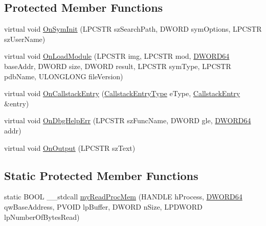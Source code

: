 \subsection*{Protected Member Functions}
\begin{DoxyCompactItemize}
\item 
virtual void \hyperlink{class_stack_walker_a7feaf96c40d81dcbd0bfcd34f78eaa30}{On\-Sym\-Init} (L\-P\-C\-S\-T\-R sz\-Search\-Path, D\-W\-O\-R\-D sym\-Options, L\-P\-C\-S\-T\-R sz\-User\-Name)
\item 
virtual void \hyperlink{class_stack_walker_a64c6c648aee9a33e881f449aecd51912}{On\-Load\-Module} (L\-P\-C\-S\-T\-R img, L\-P\-C\-S\-T\-R mod, \hyperlink{_stack_walker_8h_a97fb241c597b99bcb965858f53cacac4}{D\-W\-O\-R\-D64} base\-Addr, D\-W\-O\-R\-D size, D\-W\-O\-R\-D result, L\-P\-C\-S\-T\-R sym\-Type, L\-P\-C\-S\-T\-R pdb\-Name, U\-L\-O\-N\-G\-L\-O\-N\-G file\-Version)
\item 
virtual void \hyperlink{class_stack_walker_a0fbb480cd30e9ff437a4baf9a18c2372}{On\-Callstack\-Entry} (\hyperlink{class_stack_walker_a6de6dcd460d11abee0c498fb55cba96e}{Callstack\-Entry\-Type} e\-Type, \hyperlink{struct_stack_walker_1_1_callstack_entry}{Callstack\-Entry} \&entry)
\item 
virtual void \hyperlink{class_stack_walker_ab2220ae2084e72d2f0f005784c21e8dc}{On\-Dbg\-Help\-Err} (L\-P\-C\-S\-T\-R sz\-Func\-Name, D\-W\-O\-R\-D gle, \hyperlink{_stack_walker_8h_a97fb241c597b99bcb965858f53cacac4}{D\-W\-O\-R\-D64} addr)
\item 
virtual void \hyperlink{class_stack_walker_a20ec3b0a1ba7723e113889135989ea6b}{On\-Output} (L\-P\-C\-S\-T\-R sz\-Text)
\end{DoxyCompactItemize}
\subsection*{Static Protected Member Functions}
\begin{DoxyCompactItemize}
\item 
static B\-O\-O\-L \-\_\-\-\_\-stdcall \hyperlink{class_stack_walker_a3428311b98b8e8366419e9e5467c294d}{my\-Read\-Proc\-Mem} (H\-A\-N\-D\-L\-E h\-Process, \hyperlink{_stack_walker_8h_a97fb241c597b99bcb965858f53cacac4}{D\-W\-O\-R\-D64} qw\-Base\-Address, P\-V\-O\-I\-D lp\-Buffer, D\-W\-O\-R\-D n\-Size, L\-P\-D\-W\-O\-R\-D lp\-Number\-Of\-Bytes\-Read)
\end{DoxyCompactItemize}
